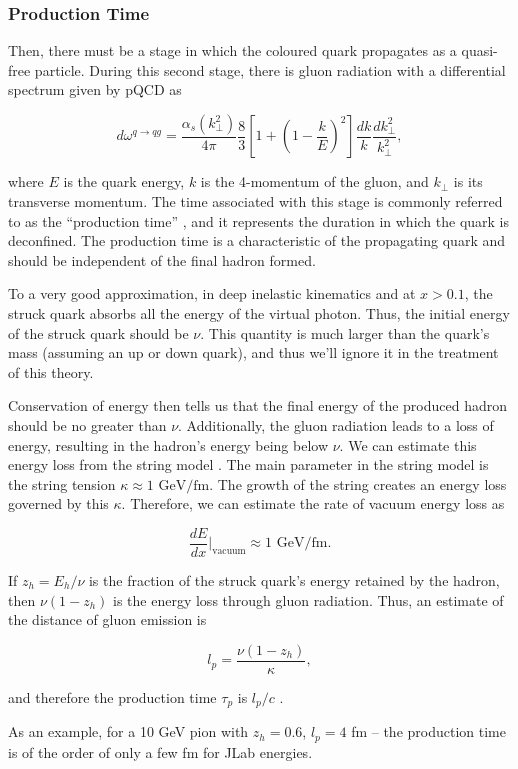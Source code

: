 \subsubsection{Production Time}
\label{sssec::production_time}
    Then, there must be a stage in which the coloured quark propagates as a quasi-free particle.
    During this second stage, there is gluon radiation with a differential spectrum given by pQCD as

    \begin{equation*}
        d\omega^{q \rightarrow qg} =
            \frac{\alpha_s(k_\perp^2)}{4\pi}
            \frac{8}{3}\left[ 1 + \left( 1 - \frac{k}{E} \right)^2 \right]
            \frac{dk}{k} \frac{dk_\perp^2}{k_\perp^2},
    \end{equation*}

    where $E$ is the quark energy, $k$ is the 4-momentum of the gluon, and $k_\perp$ is its transverse momentum.
    The time associated with this stage is commonly referred to as the ``production time'' \cite{kopeliovich2004}, and it represents the duration in which the quark is deconfined.
    The production time is a characteristic of the propagating quark and should be independent of the final hadron formed.

    To a very good approximation, in deep inelastic kinematics and at $x > 0.1$, the struck quark absorbs all the energy of the virtual photon.
    Thus, the initial energy of the struck quark should be $\nu$.
    This quantity is much larger than the quark's mass (assuming an up or down quark), and thus we'll ignore it in the treatment of this theory.

    Conservation of energy then tells us that the final energy of the produced hadron should be no greater than $\nu$.
    Additionally, the gluon radiation leads to a loss of energy, resulting in the hadron's energy being below $\nu$.
    We can estimate this energy loss from the string model \cite{artru1974}.
    The main parameter in the string model is the string tension $\kappa \approx 1 \text{ GeV}/\text{fm}$.
    The growth of the string creates an energy loss governed by this $\kappa$.
    Therefore, we can estimate the rate of vacuum energy loss as

    \begin{equation*}
        \frac{dE}{dx}\Big|_\text{vacuum} \approx 1 \text{ GeV}/\text{fm}.
    \end{equation*}

    If $z_h = E_h/\nu$ is the fraction of the struck quark's energy retained by the hadron, then $\nu(1 - z_h)$ is the energy loss through gluon radiation.
    Thus, an estimate of the distance of gluon emission is

    \begin{equation*}
        l_p = \frac{\nu(1 - z_h)}{\kappa},
    \end{equation*}

    and therefore the production time $\tau_p$ is $l_p/c$ \cite{kopeliovich2004}.

    As an example, for a 10 GeV pion with $z_h = 0.6$, $l_p = 4$ fm -- the production time is of the order of only a few fm for JLab energies.
